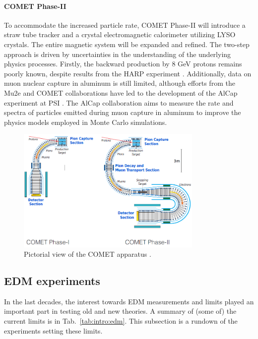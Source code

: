 \begin{refsection}
\paragraph{COMET Phase-II}
To accommodate the increased particle rate, COMET Phase-II will introduce a straw tube tracker and a crystal electromagnetic calorimeter utilizing LYSO crystals. The entire magnetic system will be expanded and refined.
The two-step approach is driven by uncertainties in the understanding of the underlying physics processes. Firstly, the backward production by 8 GeV protons remains poorly known, despite results from the HARP experiment \cite{HARP}. Additionally, data on muon nuclear capture in aluminum is still limited, although efforts from the Mu2e and COMET collaborations have led to the development of the AlCap experiment at PSI \cite{Edmonds:2015}\cite{AlCap:2015}\cite{AlCap:2018}. The AlCap collaboration aims to measure the rate and spectra of particles emitted during muon capture in aluminum to improve the physics models employed in Monte Carlo simulations.

\begin{figure}[h!]
\centering
\includegraphics[width=0.8\textwidth]{Figures/Introduction/COMET.png}
\caption[COMET experiment]{Pictorial view of the COMET apparatus \cite{COMET_I}.}
\label{_COMET}
\end{figure}

    \subsection{EDM experiments}
        \label{sec:exp:edm}
        In the last decades, the interest towards EDM measurements and limits played an important part in testing old and new theories.
        A summary of (some of) the current limits is in Tab.~\ref{tab:intro:edm}. 
        This subsection is a rundown of the experiments setting these limits.


\end{refsection}
